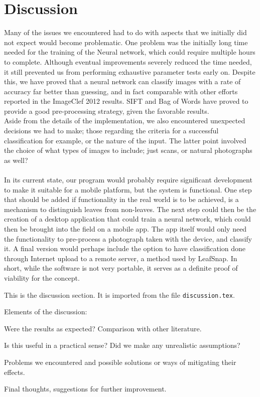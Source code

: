 \section{Discussion}
Many of the issues we encountered had to do with aspects that we initially did not expect would become problematic. One problem was the initially long time needed for the training of the Neural network, which could require multiple hours to complete. Although eventual improvements severely reduced the time needed, it still prevented us from performing exhaustive parameter tests early on. Despite this, we have proved that a neural network can classify images with a rate of accuracy far better than guessing, and in fact comparable with other efforts reported in the ImageClef 2012 results. SIFT and Bag of Words have proved to provide a good pre-processing strategy, given the favorable results.\\
Aside from the details of the implementation, we also encountered unexpected decisions we had to make; those regarding the criteria for a successful classification for example, or the nature of the input. The latter point involved the choice of what types of images to include; just scans, or natural photographs as well?\\
\\
In its current state, our program would probably require significant development to make it suitable for a mobile platform, but the system is functional. One step that should be added if functionality in the real world is to be achieved, is a mechanism to distinguish leaves from non-leaves. The next step could then be the creation of a desktop application that could train a neural network, which could then be brought into the field on a mobile app. The app itself would only need the functionality to pre-process a photograph taken with the device, and classify it. A final version would perhaps include the option to have classification done through Internet upload to a remote server, a method used by LeafSnap. In short, while the software is not very portable, it serves as a definite proof of viability for the concept.


This is the discussion section.
It is imported from the file \verb+discussion.tex+.

Elements of the discussion:

Were the results as expected? Comparison with other literature.

Is this useful in a practical sense? Did we make any unrealistic assumptions?

Problems we encountered and possible solutions or ways of mitigating their effects.

Final thoughts, suggestions for further improvement.